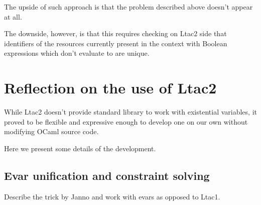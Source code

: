 The upside of such approach is that the problem described above doesn't appear at all.

The downside, however, is that this requires checking on Ltac2 side that identifiers of the resources currently present in the context with Boolean expressions which don't evaluate to \false are unique. 

\section{Reflection on the use of Ltac2}

While Ltac2 doesn't provide standard library to work with existential variables, it proved to be flexible and expressive enough to develop one on our own without modifying OCaml source code.

Here we present some details of the development.

\subsection{Evar unification and constraint solving}
\label{subsec:evar-unification-and-constr-solving}
Describe the trick by Janno and work with evars as opposed to Ltac1.


